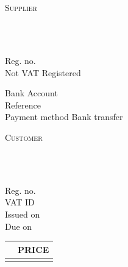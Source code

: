 \documentclass[a4paper,12pt]{article}
\newcommand{\subduedlabel}[1]{\textcolor{subdued}{\textsc{#1}}}
\newcommand{\kv}[2]{#1 \hfill #2 \\}
\newif\ifbitcoin
\begin{document}
	

	\pagestyle{empty} %

	\section*{\InvoiceTitle}

	\vspace{3em}
	\begin{minipage}[t]{0.45\textwidth}
		\subduedlabel{Supplier}

		\vspace{0.5em}
		\large \textbf{\MyName} \normalsize \\
		\MyAddressLineOne \\
		\MyAddressLineTwo

		\vspace{1.5em}
		\kv{Reg. no.}{\MyRegNo}
		Not VAT Registered

		\vspace{1.5em}
		\ifbitcoin
			~\\
		\else
			\kv{Bank Account}{\MyBankAccount}
		\fi
		\kv{Reference}{\MyReference}
		\ifbitcoin
			\kv{Payment method}{Bitcoin}
		\else
			\kv{Payment method}{Bank transfer}
		\fi
	\end{minipage}
	\hfill
	\begin{minipage}[t]{0.45\textwidth}
		\subduedlabel{Customer}

		\vspace{0.5em}
		\large \textbf {\CustomerName} \normalsize \\
		\CustomerAddressLineOne \\
		\CustomerAddressLineTwo

		\vspace{1.5em}
		\kv{Reg. no.}{\CustomerRegNo}
		\kv{VAT ID}{\CustomerVatId}

		\vspace{1.5em}
		\kv{Issued on}{\InvoiceIssuedDate}
		\kv{Due on}{\InvoiceDueDate}
	\end{minipage}

	\ifbitcoin
		\textcolor{subdued}{\textit{Payment possible in BTC to the address:} \BitcoinAddress}
	\else %
	\fi

	\vspace{3em}

	\renewcommand{\arraystretch}{1.7}
	\begin{tabularx}{\textwidth}{X r}
	 	& \subduedlabel{PRICE} \\
		\hline
		\ServiceDescription & \ServicePrice \\
		\hline
	\end{tabularx}
\end{document}
